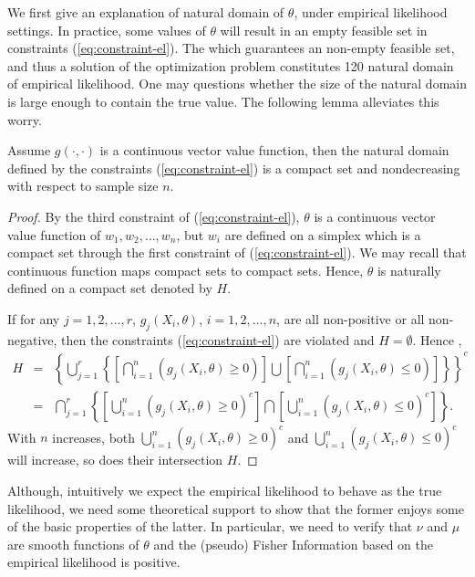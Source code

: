 We first give an explanation of natural domain of $\theta$, under
empirical likelihood settings. In practice, some values of $\theta$
will result in an empty feasible set in constraints (\ref{eq:constraint-el}).
The which guarantees an non-empty feasible set, and thus a solution
of the optimization problem constitutes 120 natural domain of empirical
likelihood. One may questions whether the size of the natural domain
is large enough to contain the true value. The following lemma alleviates
this worry.
\begin{lem}
\label{lem:nondecreasing-compact-natural-domain}Assume $g\left(\cdot,\cdot\right)$
is a continuous vector value function, then the natural domain defined
by the constraints (\ref{eq:constraint-el}) is a compact set and
nondecreasing with respect to sample size $n$.\end{lem}
\begin{proof}
By the third constraint of (\ref{eq:constraint-el}), $\theta$ is
a continuous vector value function of $w_{1},w_{2},\ldots,w_{n}$,
but $w_{i}$ are defined on a simplex which is a compact set through
the first constraint of (\ref{eq:constraint-el}). We may recall that
continuous function maps compact sets to compact sets. Hence, $\theta$
is naturally defined on a compact set denoted by $H$.

If for any $j=1,2,\ldots,r$, $g_{j}\left(X_{i},\theta\right)$, $i=1,2,\ldots,n$,
are all non-positive or all non-negative, then the constraints (\ref{eq:constraint-el})
are violated and $H=\emptyset$. Hence ,
\begin{eqnarray*}
H & = & \left\{ \bigcup_{j=1}^{r}\left\{ \left[\bigcap_{i=1}^{n}\left(g_{j}\left(X_{i},\theta\right)\ge0\right)\right]\bigcup\left[\bigcap_{i=1}^{n}\left(g_{j}\left(X_{i},\theta\right)\le0\right)\right]\right\} \right\} ^{c}\\
 & = & \bigcap_{j=1}^{r}\left\{ \left[\bigcup_{i=1}^{n}\left(g_{j}\left(X_{i},\theta\right)\ge0\right)^{c}\right]\bigcap\left[\bigcup_{i=1}^{n}\left(g_{j}\left(X_{i},\theta\right)\le0\right)^{c}\right]\right\} .
\end{eqnarray*}
With $n$ increases, both $\bigcup_{i=1}^{n}\left(g_{j}\left(X_{i},\theta\right)\ge0\right)^{c}$
and $\bigcup_{i=1}^{n}\left(g_{j}\left(X_{i},\theta\right)\le0\right)^{c}$
will increase, so does their intersection $H$. 
\end{proof}
Although, intuitively we expect the empirical likelihood to behave
as the true likelihood, we need some theoretical support to show that
the former enjoys some of the basic properties of the latter. In particular,
we need to verify that $\nu$ and $\mu$ are smooth functions of $\theta$
and the (pseudo) Fisher Information based on the empirical likelihood
is positive. 


